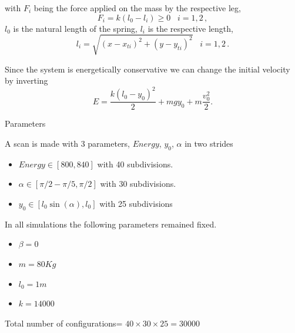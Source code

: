 \documentclass{beamer}
\begin{document}
\begin{frame}

with $F_i$ being the force applied on the mass by the respective leg,
\begin{equation}
  F_i=k(l_0-l_i)\geq 0 \,\,\,\,\, i=1,2\,,
\end{equation}
$l_0$ is the natural length of the spring, $l_i$ is the respective length,
\begin{equation}
l_i=\sqrt{(x-x_{ti})^2+(y-y_{ti})^2} \,\,\,\,\, i =1,2 \,.
\end{equation}

Since the system is energetically conservative we can change the initial velocity by inverting
  \begin{equation}
  E=\frac{k (l_0-y_0)^2}{2} + m g y_0 + m \frac{v_0^2}{2}.
\end{equation}

\end{frame}


\begin{frame}{Parameters}

    \begin{block}{A scan is made with 3 parameters, $Energy$, $y_0$, $\alpha$ in two strides}
    \begin{itemize}
\item $Energy \in  [800,840]$ with 40 subdivisions.

\item  $\alpha \in [\pi/2-\pi/5,\pi/2]$ with 30 subdivisions.

\item  $y_0 \in [l_0\sin(\alpha) ,l_0]$ with 25 subdivisions
    \end{itemize}
\end{block}
  In all simulations the following parameters remained fixed.
  \begin{itemize}
    
\item $\beta=0$
  
\item  $m=80 Kg$
  
\item $l_0=1 m$

\item  $k=14000$

 \end{itemize}

Total number of configurations= $40 \times 30 \times 25 = 30000$

 
\end{frame}
\end{document}
